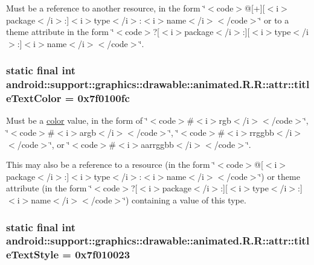 Must be a reference to another resource, in the form \char`\"{}$<$code$>$@\mbox{[}+\mbox{]}\mbox{[}$<$i$>$package$<$/i$>$:\mbox{]}$<$i$>$type$<$/i$>$:$<$i$>$name$<$/i$>$$<$/code$>$\char`\"{} or to a theme attribute in the form \char`\"{}$<$code$>$?\mbox{[}$<$i$>$package$<$/i$>$:\mbox{]}\mbox{[}$<$i$>$type$<$/i$>$:\mbox{]}$<$i$>$name$<$/i$>$$<$/code$>$\char`\"{}. \hypertarget{classandroid_1_1support_1_1graphics_1_1drawable_1_1animated_1_1_r_1_1attr_6c7e8199432bab366e783e786587f06e}{
\subsubsection[{titleTextColor}]{\setlength{\rightskip}{0pt plus 5cm}static final int android::support::graphics::drawable::animated.R.R::attr::titleTextColor = 0x7f0100fc}}
\label{classandroid_1_1support_1_1graphics_1_1drawable_1_1animated_1_1_r_1_1attr_6c7e8199432bab366e783e786587f06e}


Must be a \hyperlink{classandroid_1_1support_1_1graphics_1_1drawable_1_1animated_1_1_r_1_1color}{color} value, in the form of \char`\"{}$<$code$>$\#$<$i$>$rgb$<$/i$>$$<$/code$>$\char`\"{}, \char`\"{}$<$code$>$\#$<$i$>$argb$<$/i$>$$<$/code$>$\char`\"{}, \char`\"{}$<$code$>$\#$<$i$>$rrggbb$<$/i$>$$<$/code$>$\char`\"{}, or \char`\"{}$<$code$>$\#$<$i$>$aarrggbb$<$/i$>$$<$/code$>$\char`\"{}. 

This may also be a reference to a resource (in the form \char`\"{}$<$code$>$@\mbox{[}$<$i$>$package$<$/i$>$:\mbox{]}$<$i$>$type$<$/i$>$:$<$i$>$name$<$/i$>$$<$/code$>$\char`\"{}) or theme attribute (in the form \char`\"{}$<$code$>$?\mbox{[}$<$i$>$package$<$/i$>$:\mbox{]}\mbox{[}$<$i$>$type$<$/i$>$:\mbox{]}$<$i$>$name$<$/i$>$$<$/code$>$\char`\"{}) containing a value of this type. \hypertarget{classandroid_1_1support_1_1graphics_1_1drawable_1_1animated_1_1_r_1_1attr_d94774ad8921aee75f19e0d3f418a1d0}{
\subsubsection[{titleTextStyle}]{\setlength{\rightskip}{0pt plus 5cm}static final int android::support::graphics::drawable::animated.R.R::attr::titleTextStyle = 0x7f010023}}
\label{classandroid_1_1support_1_1graphics_1_1drawable_1_1animated_1_1_r_1_1attr_d94774ad8921aee75f19e0d3f418a1d0}


